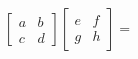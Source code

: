 \documentclass[preview]{standalone}
\begin{document}
\begin{align*}
\begin{bmatrix} a & b \\ c & d \end{bmatrix}\begin{bmatrix} e & f \\ g & h \end{bmatrix} =
\end{align*}
\end{document}

